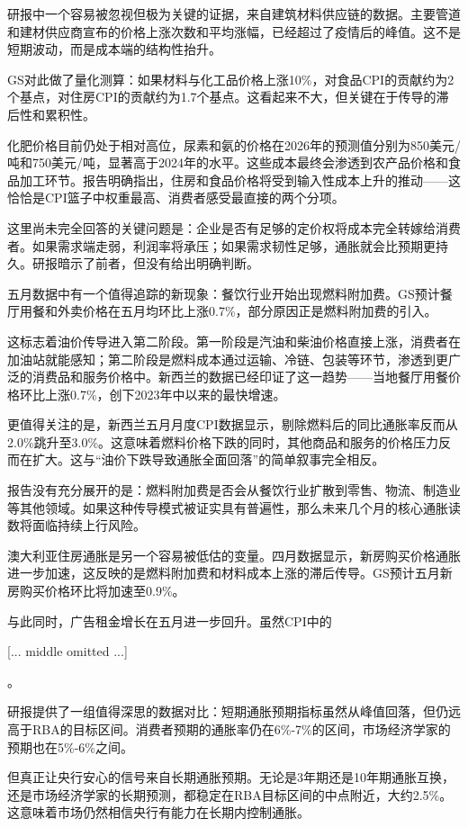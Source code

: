\documentclass[11pt]{ctexart}
\begin{document}
研报中一个容易被忽视但极为关键的证据，来自建筑材料供应链的数据。主要管道和建材供应商宣布的价格上涨次数和平均涨幅，已经超过了疫情后的峰值。这不是短期波动，而是成本端的结构性抬升。

GS对此做了量化测算：如果材料与化工品价格上涨10\%，对食品CPI的贡献约为2个基点，对住房CPI的贡献约为1.7个基点。这看起来不大，但关键在于传导的滞后性和累积性。

化肥价格目前仍处于相对高位，尿素和氨的价格在2026年的预测值分别为850美元/吨和750美元/吨，显著高于2024年的水平。这些成本最终会渗透到农产品价格和食品加工环节。报告明确指出，住房和食品价格将受到输入性成本上升的推动——这恰恰是CPI篮子中权重最高、消费者感受最直接的两个分项。

这里尚未完全回答的关键问题是：企业是否有足够的定价权将成本完全转嫁给消费者。如果需求端走弱，利润率将承压；如果需求韧性足够，通胀就会比预期更持久。研报暗示了前者，但没有给出明确判断。

五月数据中有一个值得追踪的新现象：餐饮行业开始出现燃料附加费。GS预计餐厅用餐和外卖价格在五月均环比上涨0.7\%，部分原因正是燃料附加费的引入。

这标志着油价传导进入第二阶段。第一阶段是汽油和柴油价格直接上涨，消费者在加油站就能感知；第二阶段是燃料成本通过运输、冷链、包装等环节，渗透到更广泛的消费品和服务价格中。新西兰的数据已经印证了这一趋势——当地餐厅用餐价格环比上涨0.7\%，创下2023年中以来的最快增速。

更值得关注的是，新西兰五月月度CPI数据显示，剔除燃料后的同比通胀率反而从2.0\%跳升至3.0\%。这意味着燃料价格下跌的同时，其他商品和服务的价格压力反而在扩大。这与“油价下跌导致通胀全面回落”的简单叙事完全相反。

报告没有充分展开的是：燃料附加费是否会从餐饮行业扩散到零售、物流、制造业等其他领域。如果这种传导模式被证实具有普遍性，那么未来几个月的核心通胀读数将面临持续上行风险。

澳大利亚住房通胀是另一个容易被低估的变量。四月数据显示，新房购买价格通胀进一步加速，这反映的是燃料附加费和材料成本上涨的滞后传导。GS预计五月新房购买价格环比将加速至0.9\%。

与此同时，广告租金增长在五月进一步回升。虽然CPI中的

[... middle omitted ...]

。

研报提供了一组值得深思的数据对比：短期通胀预期指标虽然从峰值回落，但仍远高于RBA的目标区间。消费者预期的通胀率仍在6\%-7\%的区间，市场经济学家的预期也在5\%-6\%之间。

但真正让央行安心的信号来自长期通胀预期。无论是3年期还是10年期通胀互换，还是市场经济学家的长期预测，都稳定在RBA目标区间的中点附近，大约2.5\%。这意味着市场仍然相信央行有能力在长期内控制通胀。
\end{document}
